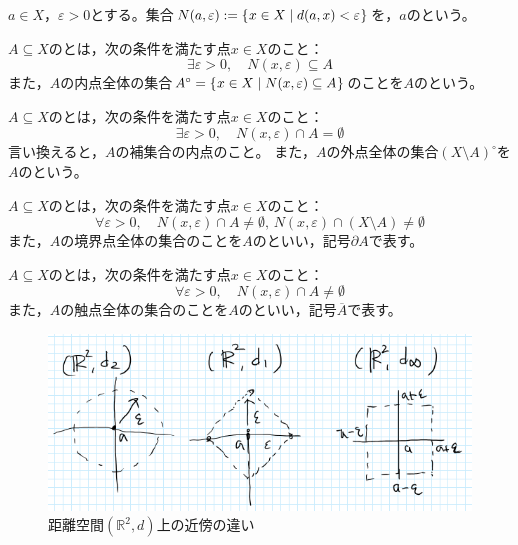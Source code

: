 \documentclass[uplatex]{jsarticle}
\begin{document}
\begin{teigi} %
     $a \in X$，$\varepsilon > 0$とする。集合$N(a,\varepsilon) := \Set{\hspace{-1.8pt} x \in X | d(a,x) < \varepsilon \hspace{-1.8pt}}$を，$a$のという。

     $A \subseteq X$のとは，次の条件を満たす点$x \in X$のこと：
    \begin{equation}
        \exists \varepsilon > 0, \quad N(x,\varepsilon) \subseteq A
    \end{equation}
    また，$A$の内点全体の集合$A^{\circ} = \Set{\hspace{-1.8pt} x \in X | N(x, \varepsilon) \subseteq A \hspace{-1.8pt}}$のことを$A$のという。

     $A \subseteq X$のとは，次の条件を満たす点$x \in X$のこと：
    \begin{equation}
        \exists \varepsilon > 0, \quad N(x , \varepsilon ) \cap A = \emptyset
    \end{equation}
    言い換えると，$A$の補集合の内点のこと。
    また，$A$の外点全体の集合$(X \setminus A)^{\circ}$を$A$のという。

     $A \subseteq X$のとは，次の条件を満たす点$x \in X$のこと：
    \begin{equation}
        \forall \varepsilon > 0, \quad N(x, \varepsilon) \cap A \neq \emptyset, \, N(x,\varepsilon) \cap (X \setminus A) \neq \emptyset
    \end{equation}
    また，$A$の境界点全体の集合のことを$A$のといい，記号$\partial A$で表す。

     $A \subseteq X$のとは，次の条件を満たす点$x \in X$のこと：
    \begin{equation}
        \forall \varepsilon > 0, \quad N (x,\varepsilon) \cap A \neq \emptyset
    \end{equation}
    また，$A$の触点全体の集合のことを$A$のといい，記号$\overline{A}$で表す。
\end{teigi}

\begin{figure}[htbp]
    \centering
    \includegraphics[clip,width=0.8\columnwidth]{euclid_dist.png}
    \caption{距離空間$(\mathbb{R}^{2},d)$上の近傍の違い}
    \label{fig:euclid_dist}
\end{figure}
\end{document}

